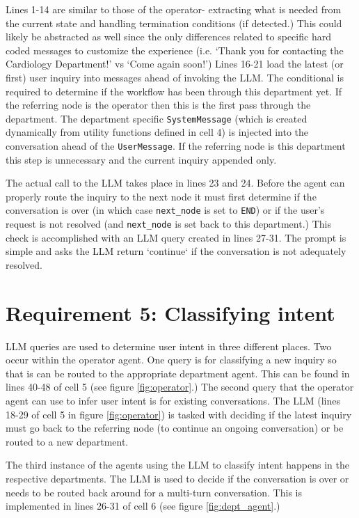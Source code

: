 \documentclass[11pt,letterpaper]{article}
\begin{document}
Lines 1-14 are similar to those of the operator- extracting what is needed from the current state and handling termination conditions (if detected.) 
This could likely be abstracted as well since the only differences related to specific hard coded messages to customize the experience (i.e. `Thank you for contacting the Cardiology Department!' vs `Come again soon!') Lines 16-21 load the latest (or first) user inquiry into messages ahead of invoking the LLM. The conditional is required to determine if the workflow has been through this department yet. If the referring node is the operator then this is the first pass through the department. The department specific \texttt{SystemMessage} (which is created dynamically from utility functions defined in cell 4) is injected into the conversation ahead of the \texttt{UserMessage}. If the referring node is this department this step is unnecessary and the current inquiry appended only.

The actual call to the LLM takes place in lines 23 and 24. Before the agent can properly route the inquiry to the next node it must first determine if the conversation is over (in which case \texttt{next\_node} is set to \texttt{END}) or if the user's request is not resolved (and \texttt{next\_node} is set back to this department.) This check is accomplished with an LLM query created in lines 27-31. The prompt is simple and asks the LLM return `continue` if the conversation is not adequately resolved. 

\section*{Requirement 5: Classifying intent}
\tab LLM queries are used to determine user intent in three different places. Two occur within the operator agent. One query is for classifying a new inquiry so that is can be routed to the appropriate department agent. This can be found in lines 40-48 of cell 5 (see figure \ref{fig:operator}.) The second query that the operator agent can use to infer user intent is for existing conversations. The LLM (lines 18-29 of cell 5 in figure \ref{fig:operator}) is tasked with deciding if the latest inquiry must go back to the referring node (to continue an ongoing conversation) or be routed to a new department.

The third instance of the agents using the LLM to classify intent happens in the respective departments. The LLM is used to decide if the conversation is over or needs to be routed back around for a multi-turn conversation. This is implemented in lines 26-31 of cell 6 (see figure \ref{fig:dept_agent}.)
\end{document}
